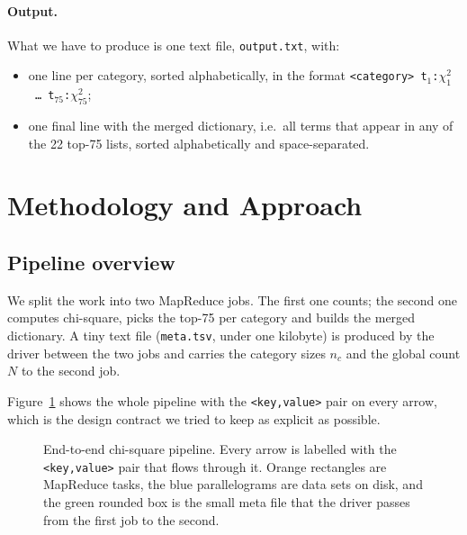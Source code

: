 \documentclass[11pt,a4paper]{article}
\begin{document}
\paragraph{Output.}  What we have to produce is one text file,
\texttt{output.txt}, with:

\begin{itemize}
    \item one line per category, sorted alphabetically, in the format
      \mbox{\small\texttt{<category>\ t$_1$:$\chi^2_1$\ \ldots\ t$_{75}$:$\chi^2_{75}$}};
    \item one final line with the merged dictionary, i.e.\ all terms
      that appear in any of the 22 top-75 lists, sorted alphabetically
      and space-separated.
\end{itemize}

\section{Methodology and Approach}

\subsection{Pipeline overview}
\label{sec:pipeline}

We split the work into two MapReduce jobs. The first one counts; the
second one computes chi-square, picks the top-75 per category and
builds the merged dictionary. A tiny text file (\texttt{meta.tsv},
under one kilobyte) is produced by the driver between the two jobs and
carries the category sizes $n_c$ and the global count $N$ to the
second job.

Figure~\ref{fig:pipeline} shows the whole pipeline with the
\texttt{<key,value>} pair on every arrow, which is the design contract
we tried to keep as explicit as possible.

\begin{figure}[p]
    \centering
    \resizebox{!}{0.84\textheight}{}
    \caption{End-to-end chi-square pipeline. Every arrow is labelled with
             the \texttt{<key,value>} pair that flows through it.
             Orange rectangles are MapReduce tasks, the blue
             parallelograms are data sets on disk, and the green rounded
             box is the small meta file that the driver passes from the
             first job to the second.}
    \label{fig:pipeline}
\end{figure}
\end{document}
